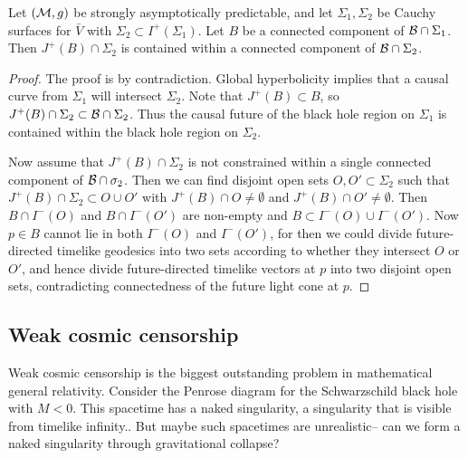 \begin{thm}
    Let $(\mathcal{M},g)$ be strongly asymptotically predictable, and let $\Sigma_1,\Sigma_2$ be Cauchy surfaces for $\bar V$ with $\Sigma_2\subset I^+(\Sigma_1)$. Let $B$ be a connected component of $\mathcal{B} \cap \Sigma_1$. Then $J^+(B)\cap \Sigma_2$ is contained within a connected component of $\mathcal{B}\cap \Sigma_2$.
\end{thm}
\begin{proof}
    The proof is by contradiction. Global hyperbolicity implies that a causal curve from $\Sigma_1$ will intersect $\Sigma_2$. Note that $J^+(B)\subset B$, so $J^+(B)\cap \Sigma_2 \subset \mathcal{B}\cap \Sigma_2$. Thus the causal future of the black hole region on $\Sigma_1$ is contained within the black hole region on $\Sigma_2$.
    
    Now assume that $J^+(B)\cap \Sigma_2$ is not constrained within a single connected component of $\mathcal{B} \cap \sigma_2$. Then we can find disjoint open sets $O,O' \subset \Sigma_2$ such that $J^+(B) \cap \Sigma_2 \subset O\cup O'$ with $J^+(B)\cap O \neq \emptyset$ and $J^+(B)\cap O' \neq \emptyset$. Then $B \cap I^-(O)$ and $B \cap I^-(O')$ are non-empty and $B\subset I^-(O)\cup I^- (O')$. Now $p\in B$ cannot lie in both $I^-(O)$ and $I^-(O')$, for then we could divide future-directed timelike geodesics into two sets according to whether they intersect $O$ or $O'$, and hence divide future-directed timelike vectors at $p$ into two disjoint open sets, contradicting connectedness of the future light cone at $p.$
\end{proof}

\subsection*{Weak cosmic censorship}
Weak cosmic censorship is the biggest outstanding problem in mathematical general relativity. Consider the Penrose diagram for the Schwarzschild black hole with $M<0$. This spacetime has a naked singularity, a singularity that is visible from timelike infinity.. But maybe such spacetimes are unrealistic-- can we form a naked singularity through gravitational collapse?


